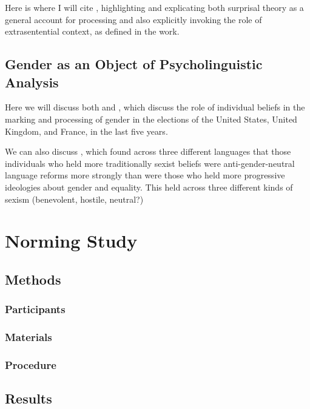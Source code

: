 \documentclass{article}
\begin{document}
	Here is where I will cite \parencite{levy2008expectation}, highlighting and explicating both surprisal theory as a general account for processing and also explicitly invoking the role of extrasentential context, as defined in the work.
	
	\subsection{Gender as an Object of Psycholinguistic Analysis}
	
	Here we will discuss both \textcite{pozniak2021failures} and \textcite{von2020implicit}, which discuss the role of individual beliefs in the marking and processing of gender in the elections of the United States, United Kingdom, and France, in the last five years.
	
	We can also discuss \textcite{sarrasin2012sexism}, which found across three different languages that those individuals who held more traditionally sexist beliefs were anti-gender-neutral language reforms more strongly than were those who held more progressive ideologies about gender and equality. This held across three different kinds of sexism (benevolent, hostile, neutral?)

	\newpage
	\section{Norming Study}
	
	\subsection{Methods}
	
	\subsubsection{Participants}
	
	\subsubsection{Materials}
	
	\subsubsection{Procedure}
	
	\subsection{Results}
	
\end{document}
